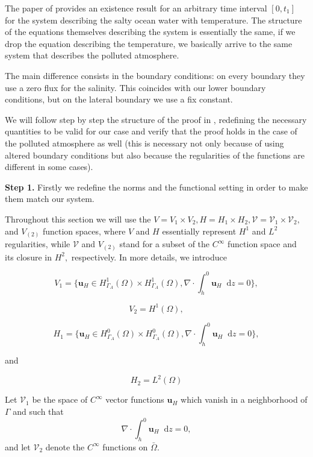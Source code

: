 \documentclass[11pt]{article}
\newcommand*\diff{\mathop{}\!\mathrm{d}}
\begin{document}
The paper of \cite{temam2005some} provides an existence result for an arbitrary time interval $[0, t_1]$ for the system describing the salty ocean water with temperature. The structure of the equations themselves describing the system is essentially the same, if we drop the equation describing the temperature, we basically arrive to the same system that describes the polluted atmosphere.

The main difference consists in the boundary conditions: on every boundary they use a zero flux for the salinity. This coincides with our lower boundary conditions, but on the lateral boundary we use a fix constant.

We will follow step by step the structure of the proof in \cite{temam2005some}, redefining the necessary quantities to be valid for our case and verify that the proof holds in the case of the polluted atmosphere as well (this is necessary not only because of using altered boundary conditions but also because the regularities of the functions are different in some cases).

\textbf{Step 1.} Firstly we redefine the norms and the functional setting in order to make them match our system.

Throughout this section we will use the $V = V_1 \times V_2, H = H_1 \times H_2, \mathcal{V} = \mathcal{V}_1 \times \mathcal{V}_2,$ and $V_{(2)}$ function spaces, where $V$ and $H$ essentially represent $H^1$ and $L^2$ regularities, while $\mathcal{V}$ and $V_{(2)}$ stand for a subset of the $C^{\infty}$ function space and its closure in $H^2,$ respectively. In more details, we introduce

$$ V_1 = \{ \mathbf{u}_H \in H^1_{\Gamma_A} (\Omega) \times H^1_{\Gamma_A} (\Omega), \nabla \cdot \int_h^0 \mathbf{u}_H \diff z = 0  \}, $$

$$ V_2 = H^1(\Omega), $$

$$ H_1 =  \{ \mathbf{u}_H \in H^0_{\Gamma_A} (\Omega) \times H^0_{\Gamma_A} (\Omega), \nabla \cdot \int_h^0 \mathbf{u}_H \diff z = 0  \}, $$

and

$$ H_2 = L^2(\Omega) $$

Let $\mathcal{V}_1$ be the space of $C^\infty$ vector functions $\mathbf{u}_H$ which vanish in a neighborhood of $\Gamma$ and such that $$\nabla \cdot \int_h^0 \mathbf{u}_H \diff z = 0,$$ and let $\mathcal{V}_2$ denote the $C^\infty$ functions on $\bar{\Omega}$.
\end{document}
